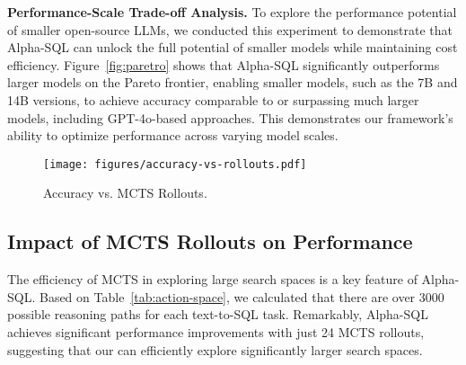 \textbf{Performance-Scale Trade-off Analysis.} To explore the performance potential of smaller open-source LLMs, we conducted this experiment to demonstrate that Alpha-SQL can unlock the full potential of smaller models while maintaining cost efficiency.
Figure~\ref{fig:paretro} shows that Alpha-SQL significantly outperforms larger models on the Pareto frontier, enabling smaller models, such as the 7B and 14B versions, to achieve accuracy comparable to or surpassing much larger models, including GPT-4o-based approaches. This demonstrates our framework’s ability to optimize \nlsql performance across varying model scales.



\begin{figure}[t!]
    \centering
    \vspace{-0.5em}
\texttt{[image: figures/accuracy-vs-rollouts.pdf]}
    \vspace{-1.5em}
    \caption{Accuracy vs. MCTS Rollouts.}
    \label{fig:scaling}
\end{figure}

\subsection{Impact of MCTS Rollouts on Performance}
\label{subsec:exp-scale}

The efficiency of MCTS in exploring large search spaces is a key feature of Alpha-SQL. Based on Table~\ref{tab:action-space}, we calculated that there are over 3000 possible reasoning paths for each text-to-SQL task. Remarkably, Alpha-SQL achieves significant performance improvements with just 24 MCTS rollouts, suggesting that our \sys can efficiently explore significantly larger search spaces.

